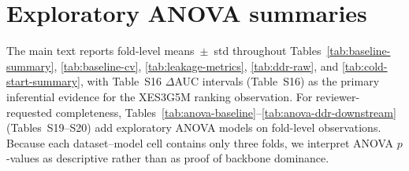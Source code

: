 \documentclass[preprint,11pt]{elsarticle}
\begin{document}
\section{Exploratory ANOVA summaries}
\label{sec:supp-anova}
The main text reports fold-level means~$\pm$~std throughout
Tables~\ref{tab:baseline-summary}, \ref{tab:baseline-cv},
\ref{tab:leakage-metrics}, \ref{tab:ddr-raw}, and
\ref{tab:cold-start-summary}, with Table~S16 $\Delta$AUC intervals
(Table~S16) as the primary inferential evidence for the XES3G5M ranking
observation. For reviewer-requested completeness, Tables~\ref{tab:anova-baseline}--\ref{tab:anova-ddr-downstream}
(Tables~S19--S20) add exploratory ANOVA models on fold-level observations. Because each
dataset--model cell contains only three folds, we interpret ANOVA
$p$-values as descriptive rather than as proof of backbone dominance.




\end{document}
